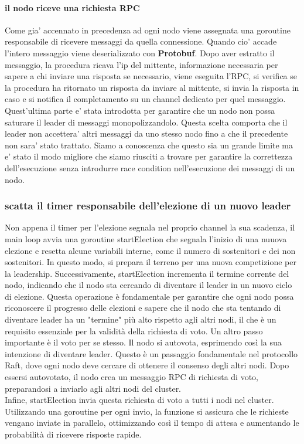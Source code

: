 \paragraph{il nodo riceve una richiesta RPC}
Come gia' accennato in precedenza ad ogni nodo viene assegnata una goroutine responsabile di
ricevere messaggi da quella connessione. Quando cio' accade l'intero messaggio viene deserializzato
con \textbf{Protobuf}.
Dopo aver estratto il messaggio, la procedura ricava l'ip del mittente, informazione necessaria per 
sapere a chi inviare una risposta se necessario,
viene eseguita l'RPC, si verifica se la procedura ha ritornato un risposta da inviare al mittente,
si invia la risposta in caso e si notifica il completamento su un channel dedicato 
per quel messaggio. Quest'ultima parte e' stata introdotta per garantire che un nodo non possa 
saturare il leader di messaggi monopolizzandolo. Questa scelta comporta che il leader non accettera' 
altri messaggi da uno stesso nodo fino a che il precedente non sara' stato trattato. Siamo a 
conoscenza che questo sia un grande limite ma e' stato il modo migliore che siamo riusciti 
a trovare per garantire la correttezza dell'esecuzione senza introdurre race condition nell'esecuzione
dei messaggi di un nodo.

\subsubsection{scatta il timer responsabile dell'elezione di un nuovo leader}
Non appena il timer per l'elezione segnala nel proprio channel la sua scadenza, il main loop avvia 
una goroutine startElection che segnala l'inizio di una nuuova elezione e resetta alcune variabili 
interne, come il numero di sostenitori e dei non sostenitori. In questo modo, si prepara il terreno 
per una nuova competizione per la leadership.
Successivamente, startElection incrementa il termine corrente del nodo, indicando che il nodo sta 
cercando di diventare il leader in un nuovo ciclo di elezione. Questa operazione è fondamentale per 
garantire che ogni nodo possa riconoscere il progresso delle elezioni e sapere che il nodo che sta 
tentando di diventare leader ha un "termine" più alto rispetto agli altri nodi, il che è un 
requisito essenziale per la validità della richiesta di voto.
Un altro passo importante è il voto per se stesso. Il nodo si autovota, esprimendo così la sua 
intenzione di diventare leader. Questo è un passaggio fondamentale nel protocollo Raft, dove ogni 
nodo deve cercare di ottenere il consenso degli altri nodi.
Dopo essersi autovotato, il nodo crea un messaggio RPC di richiesta di voto, preparandosi a 
inviarlo agli altri nodi del cluster.\\ 
Infine, startElection invia questa richiesta di voto a tutti i nodi nel cluster. Utilizzando una 
goroutine per ogni invio, la funzione si assicura che le richieste vengano inviate in parallelo, 
ottimizzando così il tempo di attesa e aumentando le probabilità di ricevere risposte rapide.


